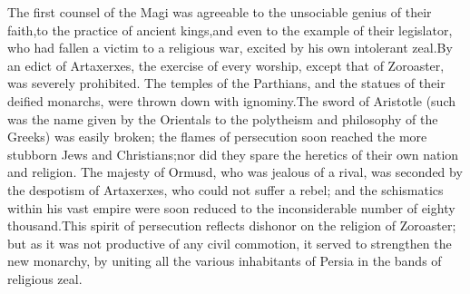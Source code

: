 The first counsel of the Magi was agreeable to the unsociable
genius of their faith,\footnotemark[24] to the practice of ancient kings,\footnotemark[25]
and even to the example of their legislator, who had fallen a
victim to a religious war, excited by his own intolerant zeal.\footnotemark[26]
By an edict of Artaxerxes, the exercise of every worship, except
that of Zoroaster, was severely prohibited. The temples of the
Parthians, and the statues of their deified monarchs, were thrown
down with ignominy.\footnotemark[27] The sword of Aristotle (such was the name
given by the Orientals to the polytheism and philosophy of the
Greeks) was easily broken; \footnotemark[28] the flames of persecution soon
reached the more stubborn Jews and Christians;\footnotemark[29] nor did they
spare the heretics of their own nation and religion. The majesty
of Ormusd, who was jealous of a rival, was seconded by the
despotism of Artaxerxes, who could not suffer a rebel; and the
schismatics within his vast empire were soon reduced to the
inconsiderable number of eighty thousand.\footnotemark[30] \footnotemark[301] This spirit of
persecution reflects dishonor on the religion of Zoroaster; but
as it was not productive of any civil commotion, it served to
strengthen the new monarchy, by uniting all the various
inhabitants of Persia in the bands of religious zeal. \footnotemark[302]








